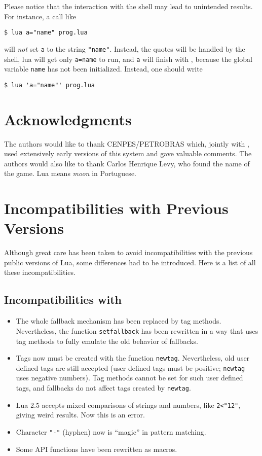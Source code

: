 Please notice that the interaction with the shell may lead to
unintended results.
For instance, a call like
\begin{verbatim}
$ lua a="name" prog.lua
\end{verbatim}
will \emph{not} set \verb|a| to the string \verb|"name"|.
Instead, the quotes will be handled by the shell,
lua will get only \verb|a=name| to run,
and \verb|a| will finish with \nil,
because the global variable \verb|name| has not been initialized.
Instead, one should write
\begin{verbatim}
$ lua 'a="name"' prog.lua
\end{verbatim}

\section*{Acknowledgments}

The authors would like to thank CENPES/PETROBRAS which,
jointly with \tecgraf, used extensively early versions of
this system and gave valuable comments.
The authors would also like to thank Carlos Henrique Levy,
who found the name of the game.
Lua means \emph{moon} in Portuguese.



\appendix

\section*{Incompatibilities with Previous Versions}

Although great care has been taken to avoid incompatibilities with
the previous public versions of Lua,
some differences had to be introduced.
Here is a list of all these incompatibilities.

\subsection*{Incompatibilities with }
\begin{itemize}
\item
The whole fallback mechanism has been replaced by tag methods.
Nevertheless, the function \verb|setfallback| has been rewritten in
a way that uses tag methods to fully emulate the old behavior
of fallbacks.
\item
Tags now must be created with the function \verb|newtag|.
Nevertheless, old user defined tags are still accepted
(user defined tags must be positive;
\verb|newtag| uses negative numbers).
Tag methods cannot be set for such user defined tags,
and fallbacks do not affect tags created by \verb|newtag|.
\item
Lua 2.5 accepts mixed comparisons of strings and numbers,
like \verb|2<"12"|, giving weird results.
Now this is an error.
\item
Character \verb|"-"| (hyphen) now is ``magic'' in pattern matching.
\item
Some API functions have been rewritten as macros.
\end{itemize}

